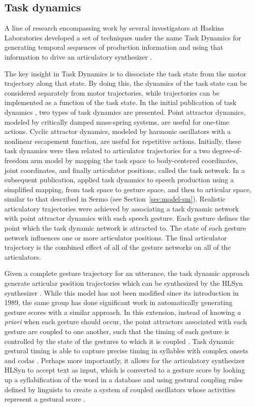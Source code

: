 \subsection{Task dynamics}

A line of research encompassing work by
several investigators at Haskins Laboratories
developed a set of techniques
under the name Task Dynamics
for generating temporal sequences
of production information
and using that information to drive
an articulatory synthesizer \citep{nam2004}.

The key insight in Task Dynamics
is to dissociate the task state
from the motor trajectory
along that state.
By doing this, the dynamics of the task state
can be considered separately from motor trajectories,
while trajectories can be implemented
as a function of the task state.
In the initial publication of task dynamics
\citep{saltzman1987},
two types of task dynamics are presented.
Point attractor dynamics,
modeled by critically damped mass-spring systems,
are useful for one-time actions.
Cyclic attractor dynamics,
modeled by harmonic oscillators
with a nonlinear escapement function,
are useful for repetitive actions.
Initially, these task dynamics were then
related to articulator trajectories
for a two degree-of-freedom arm model
by mapping the task space
to body-centered coordinates,
joint coordinates,
and finally articulator positions,
called the task network.
In a subsequent publication,
\citet{saltzman1989}
applied task dynamics to speech production
using a simplified mapping,
from task space
to gesture space,
and then to articular space,
similar to that described in Sermo
(see Section~\ref{sec:model-sm}).
Realistic articulatory trajectories
were achieved
by associating a task dynamic network
with point attractor dynamics
with each speech gesture.
Each gesture defines
the point which the task dynamic network
is attracted to.
The state of each gesture network
influences one or more articulator positions.
The final articulator trajectory
is the combined effect
of all of the gesture networks
on all of the articulators.

Given a complete gesture trajectory
for an utterance,
the task dynamic approach
generate articular position trajectories
which can be synthesized
by the HLSyn synthesizer \citep{hanson1999}.
While this model has not been
modified since its introduction in 1989,
the same group has done significant work
in automatically generating gesture scores
with a similar approach.
In this extension,
instead of knowing \textit{a priori}
when each gesture should occur,
the point attractors associated
with each gesture are coupled
to one another,
such that the timing of each gesture
is controlled by the state
of the gestures to which it is coupled
\citep{saltzman2000}.
Task dynamic gestural timing
is able to capture precise timing
in syllables with complex onsets
and codas \citep{nam2003}.
Perhaps more importantly,
it allows for the articulatory synthesizer
HLSyn to accept text as input,
which is converted to a gesture score
by looking up a syllabification
of the word in a database
and using gestural coupling rules
defined by linguists
to create a system of coupled oscillators
whose activities represent a gestural score
\citep{goldstein2009,nam2004}.

